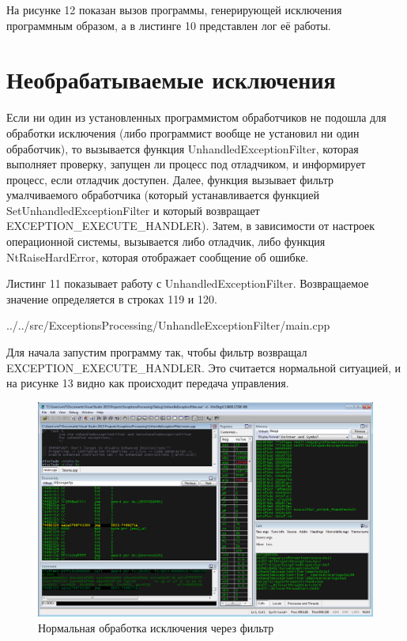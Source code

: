 \documentclass[a4paper, 12pt]{report}		%
\begin{document}
На рисунке 12 показан вызов программы, генерирующей исключения программным образом, а в листинге 10 представлен лог её работы.




\chapter*{Необрабатываемые исключения}

Если ни один из установленных программистом обработчиков не подошла для обработки исключения (либо программист вообще не установил ни один обработчик), то вызывается функция UnhandledExceptionFilter, которая выполняет проверку, запущен ли процесс под отладчиком, и информирует процесс, если отладчик доступен\cite{Dushutina}. Далее, функция вызывает фильтр умалчиваемого обработчика (который устанавливается функцией SetUnhandledExceptionFilter и который возвращает EXCEPTION\_EXECUTE\_HANDLER). Затем, в зависимости от настроек операционной системы, вызывается либо отладчик, либо функция NtRaiseHardError, которая отображает сообщение об ошибке. 

Листинг 11 показывает работу с UnhandledExceptionFilter. Возвращаемое значение определяется в строках 119 и 120.


{../../src/ExceptionsProcessing/UnhandleExceptionFilter/main.cpp}

Для начала запустим программу так, чтобы фильтр возвращал EXCEPTION\_EXECUTE\_HANDLER. Это считается нормальной ситуацией, и на рисунке 13 видно как происходит передача управления.

\begin{figure}[h!]
\centering
\includegraphics[scale=0.5]{res/006}
\caption{Нормальная обработка исключения через фильтр}
\end{figure}
\end{document}
